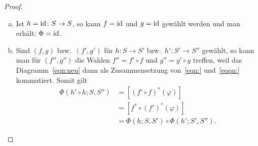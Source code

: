 \begin{proof}
  \begin{enumerate}[(a)]
    \item 
      Ist $h = \operatorname{id}\colon S \to S$, so kann $f = \operatorname{id}$ und $g = \operatorname{id}$ gewählt werden und man erhält: $\Phi = \operatorname{id}$.
    \item
      Sind $(f,g)$ bzw.\ $(f',g')$ für $h \colon S \to S'$ bzw.\ $h'\colon S' \to S''$ gewählt, so kann man für $(f'',g'')$ die Wahlen $f'' = f' \circ f$ und $g'' = g' \circ g$ treffen, weil das Diagramm~\eqref{eqn:neu} dann als Zusammensetzung von~\eqref{eqn:} und~\eqref{eqqn:} kommutiert.
      Somit gilt
      \begin{align*}
        \Phi(h' \circ h; S,S'')
          & = [{(f' \circ f)}^* (\varphi)]\\
          & = [f^* \circ {(f')}^* (\varphi)]\\
          & = \Phi(h;S,S') \circ \Phi(h';S',S'').
      \end{align*}
  \end{enumerate}
\end{proof}


